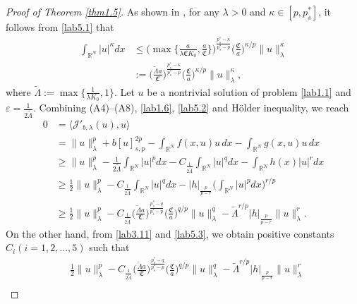 \documentclass[reqno]{amsart}
\begin{document}
\begin{proof}[Proof of Theorem \ref{thm1.5}]
As shown in \cite{r23}, for any $\lambda>0$ and $\kappa\in[p, p^*_s]$, it follows 
from \eqref{lab5.1} that
\begin{equation}\label{lab5.2}
\begin{split}
\int_{\mathbb{R}^N}|u|^\kappa dx
&\leq \Big(\max\Big\{\frac{a}{\lambda \mathfrak{C}K_0}, \frac{a}{\mathfrak{C}}\Big \}\Big)^{\frac{p_s^*-\kappa}{p_s^*-p}} \Big(\frac{\mathfrak{C}}{a}\Big)^{\kappa/p}
\|u\|^\kappa_\lambda  \\
&:= \Big(\frac{\widetilde{\Lambda}a}{\mathfrak{C}}\Big)^{\frac{p_s^*-\kappa}{p_s^*-p}} 
\Big(\frac{\mathfrak{C}}{a}\Big)^{\kappa/p}
\|u\|^\kappa_\lambda,
\end{split}
\end{equation}
where $\widetilde{\Lambda}:=\max\{\frac{1}{\lambda K_0}, 1\}$.
Let $u$ be a nontrivial solution of problem \eqref{lab1.1} and 
$\varepsilon=\frac{1}{2\widetilde{\Lambda}}$. 
Combining (A4)--(A8), \eqref{lab1.6}, \eqref{lab5.2} and H\"older inequality, we reach
\begin{equation}\label{lab5.3}
\begin{split}
0&=\langle \mathcal{J}'_{b, \lambda}(u),u\rangle \\
&=\|u\|^p_\lambda+b[u]^{2p}_{s,p}
-\int_{\mathbb{R}^N}f(x,u)u\,dx-\int_{\mathbb{R}^N}g(x, u)u\,dx \\
&\geq\|u\|^p_\lambda-\frac{1}{2\widetilde{\Lambda}}\int_{\mathbb{R}^N}|u|^pdx
-C_{\frac{1}{2\widetilde{\Lambda}}}\int_{\mathbb{R}^N}|u|^qdx-\int_{\mathbb{R}^N}h(x)|u|^rdx\\
&\geq\frac{1}{2}\|u\|^p_\lambda-C_{\frac{1}{2\widetilde{\Lambda}}}\int_{\mathbb{R}^N}|u|^qdx
-|h|_{\frac{p}{p-r}}\Big(\int_{\mathbb{R}^N}|u|^pdx\Big)^{r/p} \\
&\geq\frac{1}{2}\|u\|^p_\lambda-C_{\frac{1}{2\widetilde{\Lambda}}}
\Big(\frac{\widetilde{\Lambda}a}{\mathfrak{C}}\Big)^{\frac{p_s^*-q}{p_s^*-p}} \Big(\frac{\mathfrak{C}}{a}\Big)^{q/p}
\|u\|^q_\lambda
-\widetilde{\Lambda}^{r/p}|h|_{\frac{p}{p-r}}\|u\|^r_\lambda.
\end{split}
\end{equation}
On the other hand, from \eqref{lab3.11} and \eqref{lab5.3}, we obtain positive 
constants $C_i (i=1,2,...,5)$ such that
\begin{align*}
&\frac{1}{2}\|u\|^p_\lambda-C_{\frac{1}{2\widetilde{\Lambda}}}
\Big(\frac{\widetilde{\Lambda}a}{\mathfrak{C}}\Big)^{\frac{p_s^*-q}{p_s^*-p}} 
\Big(\frac{\mathfrak{C}}{a}\Big)^{q/p} \|u\|^q_\lambda
-\widetilde{\Lambda}^{r/p}|h|_{\frac{p}{p-r}}\|u\|^r_\lambda  \\

\end{align*}
\end{proof}
\end{document}

